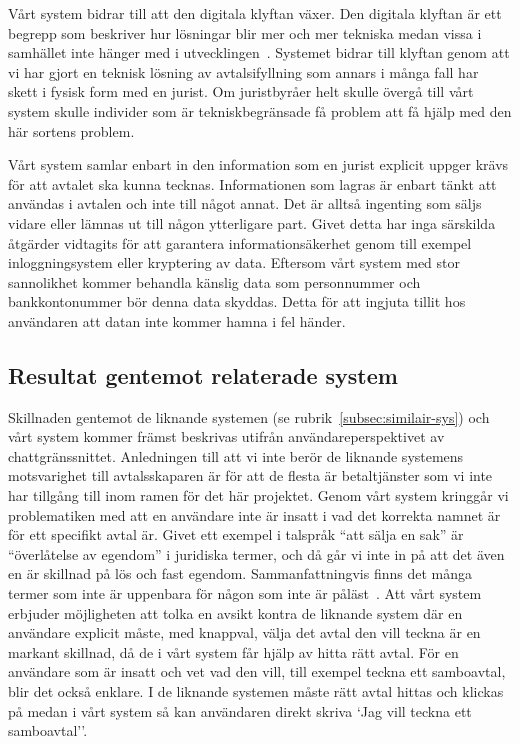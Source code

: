 \documentclass[a4paper,12pt]{article}
\begin{document}

Vårt system bidrar till att den digitala klyftan växer. Den digitala klyftan är ett begrepp som beskriver hur lösningar blir mer och mer tekniska medan vissa i samhället inte hänger med i utvecklingen~\cite{web:digitala_klyftan}. Systemet bidrar till klyftan genom att vi har gjort en teknisk lösning av avtalsifyllning som annars i många fall har skett i fysisk form med en jurist. Om juristbyråer helt skulle övergå till vårt system skulle individer som är tekniskbegränsade få problem att få hjälp med den här sortens problem.

Vårt system samlar enbart in den information som en jurist explicit uppger krävs för att avtalet ska kunna tecknas. Informationen som lagras är enbart tänkt att användas i avtalen och inte till något annat. Det är alltså ingenting som säljs vidare eller lämnas ut till någon ytterligare part. Givet detta har inga särskilda åtgärder vidtagits för att garantera informationsäkerhet genom till exempel inloggningsystem eller kryptering av data. Eftersom vårt system med stor sannolikhet kommer behandla känslig data som personnummer och bankkontonummer bör denna data skyddas. Detta för att ingjuta tillit hos användaren att datan inte kommer hamna i fel händer.

\subsection{Resultat gentemot relaterade system}
Skillnaden gentemot de liknande systemen (se rubrik~\ref{subsec:similair-sys}) och vårt system kommer främst beskrivas utifrån användareperspektivet av chattgränssnittet. Anledningen till att vi inte berör de liknande systemens motsvarighet till avtalsskaparen är för att de flesta är betaltjänster som vi inte har tillgång till inom ramen för det här projektet. 
Genom vårt system kringgår vi problematiken med att en användare inte är insatt i vad det korrekta namnet är för ett specifikt avtal är. Givet ett exempel i talspråk ``att sälja en sak'' är ``överlåtelse av egendom'' i juridiska termer, och då går vi inte in på att det även en är skillnad på lös och fast egendom. Sammanfattningvis finns det många termer som inte är uppenbara för någon som inte är påläst~\cite{web:consector}. Att vårt system erbjuder möjligheten att tolka en avsikt kontra de liknande system där en användare explicit måste, med knappval, välja det avtal den vill teckna är en markant skillnad, då de i vårt system får hjälp av hitta rätt avtal. För en användare som är insatt och vet vad den vill, till exempel teckna ett samboavtal, blir det också enklare. I de liknande systemen måste rätt avtal hittas och klickas på medan i vårt system så kan användaren direkt skriva `Jag vill teckna ett samboavtal''. 
\end{document}
